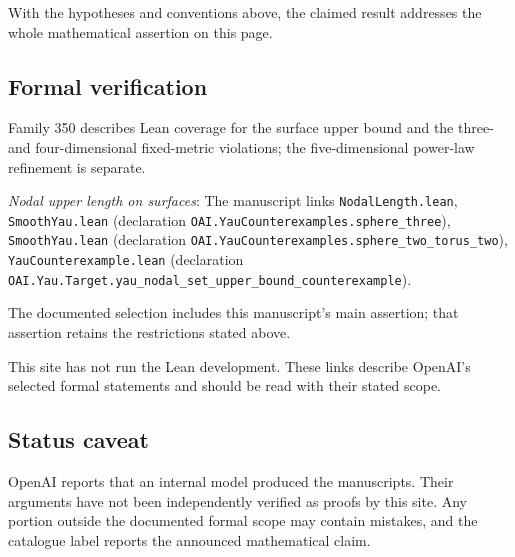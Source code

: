 \documentclass[11pt]{article}
\begin{document}
With the hypotheses and conventions above, the claimed result addresses the whole mathematical assertion on this page.

\subsection{Formal verification}
Family 350 describes Lean coverage for the surface upper bound and the three- and four-dimensional fixed-metric violations; the five-dimensional power-law refinement is separate.

\textit{Nodal upper length on surfaces}: The manuscript links \texttt{NodalLength.lean}, \texttt{SmoothYau.lean} (declaration \texttt{OAI.YauCounterexamples.sphere\_three}), \texttt{SmoothYau.lean} (declaration \texttt{OAI.YauCounterexamples.sphere\_two\_torus\_two}), \texttt{YauCounterexample.lean} (declaration \texttt{OAI.Yau.Target.yau\_nodal\_set\_upper\_bound\_counterexample}).

The documented selection includes this manuscript’s main assertion; that assertion retains the restrictions stated above.

This site has not run the Lean development. These links describe OpenAI’s selected formal statements and should be read with their stated scope.

\subsection{Status caveat}
OpenAI reports that an internal model produced the manuscripts. Their arguments have not been independently verified as proofs by this site. Any portion outside the documented formal scope may contain mistakes, and the catalogue label reports the announced mathematical claim.
\end{document}
